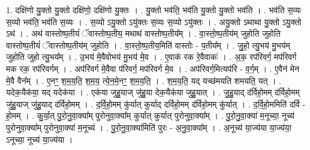 \documentclass[17pt]{extarticle}
\begin{document}
1. दक्षि॑णो यु॒क्तो यु॒क्तो दक्षि॑णो॒ दक्षि॑णो यु॒क्तः । . यु॒क्तो भव॑ति॒ भव॑ति यु॒क्तो यु॒क्तो भव॑ति । . भव॑ति स॒व्यः स॒व्यो भव॑ति॒ भव॑ति स॒व्यः । . स॒व्यो ऽयु॒क्तो ऽयु॑क्तः स॒व्यः स॒व्यो ऽयु॑क्तः । . अयु॒क्तो ऽथाथा यु॒क्तो ऽयु॒क्तो ऽथ॑ । . अथ॑ वास्तोष्प॒तीयं॑ ॅवास्तोष्प॒तीय॒ मथाथ॑ वास्तोष्प॒तीय᳚म् । . वा॒स्तो॒ष्प॒तीय॑म् जुहोति जुहोति वास्तोष्प॒तीयं॑ ॅवास्तोष्प॒तीय॑म् जुहोति । . वा॒स्तो॒ष्प॒तीय॒मिति॑ वास्तोः - प॒तीय᳚म् । . जु॒हो॒ त्यु॒भय॑ मु॒भय॑म् जुहोति जुहो त्यु॒भय᳚म् । . उ॒भय॑ मे॒वैवोभय॑ मु॒भय॑ मे॒व । . ए॒वाक॑ रक रे॒वैवाकः॑ । . अ॒क॒ रप॑रिवर्ग॒ मप॑रिवर्ग मक रक॒ रप॑रिवर्गम् । . अप॑रिवर्ग मे॒वैवा प॑रिवर्ग॒ मप॑रिवर्ग मे॒व । . अप॑रिवर्ग॒मित्यप॑रि - व॒र्ग॒म् । . ए॒वैन॑ मेन मे॒वै वैन᳚म् । . ए॒नꣳ॒॒ श॒म॒य॒ति॒ श॒म॒य॒ त्ये॒न॒मे॒नꣳ॒॒ श॒म॒य॒ति॒ । . श॒म॒य॒ति॒ यद् यच्छ॑मयति शमयति॒ यत् । . यदेक॒यैक॑या॒ यद् यदेक॑या । . एक॑या जुहु॒याज् जु॑हु॒या देक॒यैक॑या जुहु॒यात् । . जु॒हु॒याद् द॑र्विहो॒मम् द॑र्विहो॒मम् जु॑हु॒याज् जु॑हु॒याद् द॑र्विहो॒मम् । . द॒र्वि॒हो॒मम् कु॑र्यात् कुर्याद् दर्विहो॒मम् द॑र्विहो॒मम् कु॑र्यात् । . द॒र्वि॒हो॒ममिति॑ दर्वि - हो॒मम् । . कु॒र्या॒त् पु॒रो॒नु॒वा॒क्या᳚म् पुरोनुवा॒क्या᳚म् कुर्यात् कुर्यात् पुरोनुवा॒क्या᳚म् । . पु॒रो॒नु॒वा॒क्या॑ म॒नूच्या॒ नूच्य॑ पुरोनुवा॒क्या᳚म् पुरोनुवा॒क्या॑ म॒नूच्य॑ । . पु॒रो॒नु॒वा॒क्या॑मिति॑ पुरः - अ॒नु॒वा॒क्या᳚म् । . अ॒नूच्य॑ या॒ज्य॑या या॒ज्य॑या॒ ऽनूच्या॒ नूच्य॑ या॒ज्य॑या । \newline
\end{document}
